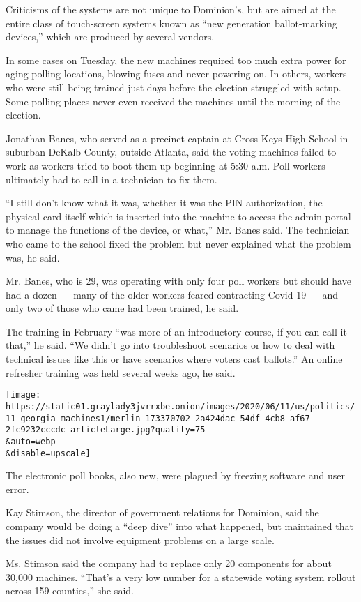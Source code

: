 Criticisms of the systems are not unique to Dominion's, but are aimed at
the entire class of touch-screen systems known as ``new generation
ballot-marking devices,'' which are produced by several vendors.

In some cases on Tuesday, the new machines required too much extra power
for aging polling locations, blowing fuses and never powering on. In
others, workers who were still being trained just days before the
election struggled with setup. Some polling places never even received
the machines until the morning of the election.

Jonathan Banes, who served as a precinct captain at Cross Keys High
School in suburban DeKalb County, outside Atlanta, said the voting
machines failed to work as workers tried to boot them up beginning at
5:30 a.m. Poll workers ultimately had to call in a technician to fix
them.

``I still don't know what it was, whether it was the PIN authorization,
the physical card itself which is inserted into the machine to access
the admin portal to manage the functions of the device, or what,'' Mr.
Banes said. The technician who came to the school fixed the problem but
never explained what the problem was, he said.

Mr. Banes, who is 29, was operating with only four poll workers but
should have had a dozen --- many of the older workers feared contracting
Covid-19 --- and only two of those who came had been trained, he said.

The training in February ``was more of an introductory course, if you
can call it that,'' he said. ``We didn't go into troubleshoot scenarios
or how to deal with technical issues like this or have scenarios where
voters cast ballots.'' An online refresher training was held several
weeks ago, he said.

\texttt{[image: https://static01.graylady3jvrrxbe.onion/images/2020/06/11/us/politics/11-georgia-machines1/merlin\_173370702\_2a424dac-54df-4cb8-af67-2fc9232cccdc-articleLarge.jpg?quality=75\\\&auto=webp\\\&disable=upscale]}

The electronic poll books, also new, were plagued by freezing software
and user error.

Kay Stimson, the director of government relations for Dominion, said the
company would be doing a ``deep dive'' into what happened, but
maintained that the issues did not involve equipment problems on a large
scale.

Ms. Stimson said the company had to replace only 20 components for about
30,000 machines. ``That's a very low number for a statewide voting
system rollout across 159 counties,'' she said.

